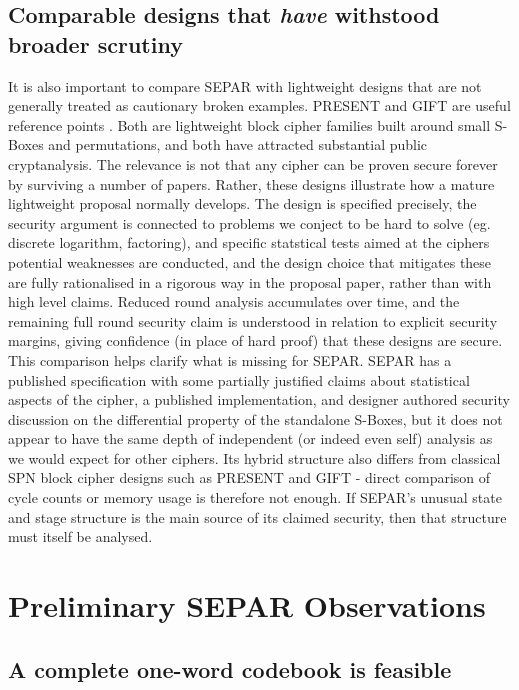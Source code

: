 \documentclass[11pt]{article}
\begin{document}
\subsection{Comparable designs that \textit{have} withstood broader scrutiny}

It is also important to compare SEPAR with lightweight designs that are not generally treated as cautionary broken examples. PRESENT and GIFT are useful reference points \cite{Bogdanov2007,Banik2017}. Both are lightweight block cipher families built around small S-Boxes and permutations, and both have attracted substantial public cryptanalysis. The relevance is not that any cipher can be proven secure forever by surviving a number of papers. Rather, these designs illustrate how a mature lightweight proposal normally develops. The design is specified precisely, the security argument is connected to problems we conject to be hard to solve (eg. discrete logarithm, factoring), and specific statstical tests aimed at the ciphers potential weaknesses are conducted, and the design choice that mitigates these are fully rationalised in a rigorous way in the proposal paper, rather than with high level claims. Reduced round analysis accumulates over time, and the remaining full round security claim is understood in relation to explicit security margins, giving confidence (in place of hard proof) that these designs are secure.\\

This comparison helps clarify what is missing for SEPAR. SEPAR has a published specification with some partially justified claims about statistical aspects of the cipher, a published implementation, and designer authored security discussion on the differential property of the standalone S-Boxes, but it does not appear to have the same depth of independent (or indeed even self) analysis as we would expect for other ciphers. Its hybrid structure also differs from classical SPN block cipher designs such as PRESENT and GIFT - direct comparison of cycle counts or memory usage is therefore not enough. If SEPAR's unusual state and stage structure is the main source of its claimed security, then that structure must itself be analysed.

\section{Preliminary SEPAR Observations}

\subsection{A complete one-word codebook is feasible}
\end{document}
